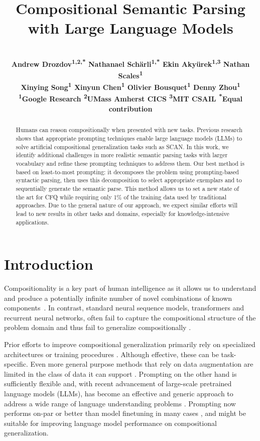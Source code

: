 \documentclass{article} \usepackage{iclr2022_conference,times}
\title{Compositional Semantic Parsing with Large Language Models}
\author{\\[-4ex]\bf Andrew Drozdov\textsuperscript{1,2,*}
\quad Nathanael Sch\"arli\textsuperscript{1,*}
\quad Ekin Aky\"urek\textsuperscript{1,3}
\quad Nathan Scales\textsuperscript{1} \\ 
\bf Xinying Song\textsuperscript{1}
\quad Xinyun Chen\textsuperscript{1}
\quad Olivier Bousquet\textsuperscript{1}
\quad Denny Zhou\textsuperscript{1} \\[0.5ex]
\textsuperscript{1}Google Research
\quad \textsuperscript{2}UMass Amherst CICS
\quad \textsuperscript{3}MIT CSAIL
\quad \textsuperscript{*}Equal contribution
\vspace{-3ex}}
\begin{document}
\doparttoc \faketableofcontents 

\maketitle

\thispagestyle{firstpage}

\begin{abstract}
Humans can reason compositionally when presented with new tasks.  Previous research shows that appropriate prompting techniques enable large language models (LLMs) to solve artificial compositional generalization tasks such as SCAN. In this work, we identify additional challenges in more realistic semantic parsing tasks with larger vocabulary and refine these prompting techniques to address them. Our best method is based on least-to-most prompting: it decomposes the problem using prompting-based syntactic parsing, then uses this decomposition to select appropriate exemplars and to sequentially generate the semantic parse. This method allows us to set a new state of the art for CFQ while requiring only 1\% of the training data used by traditional approaches. Due to the general nature of our approach, we expect similar efforts will lead to new results in other tasks and domains, especially for knowledge-intensive applications.
\end{abstract}



\section{Introduction}

Compositionality is a key part of human intelligence as it allows us to understand and produce a potentially infinite number of novel combinations of known components~\citep{chomsky1957syntax,Montague1970grammar,lake2017buildingmachines}. In contrast, standard neural sequence models, transformers and recurrent neural networks, often fail to capture the compositional
structure of the problem domain and thus fail to generalize compositionally
\citep{Keysers2020MeasuringCG,Furrer2020CompositionalGI}.

Prior efforts to improve compositional generalization primarily rely on specialized architectures or training procedures \citep{lake2019compositional,xinyun2020neuralsymbolic,nye2020learning,andreas-2020-good,conklin-etal-2021-meta,ekina2021recombine,liu-etal-2021-learning-algebraic}. Although effective, these can be task-specific. Even more general purpose methods that rely on data augmentation are limited in the class of data it can support \citep{shaw2020compositional,qiu-etal-2022-improving}.
Prompting on the other hand is sufficiently flexible and, with recent advancement of large-scale pretrained language models (LLMs), has become an effective and generic approach to address a wide range of language understanding problems \citep{gpt3}. Prompting now performs on-par or better than model finetuning in many cases \citep{Wei2022ChainOT,palm2022,wei2022emergent,kojima2022large,palm2022saycan}, and might be suitable for improving language model performance on compositional generalization.
\end{document}
